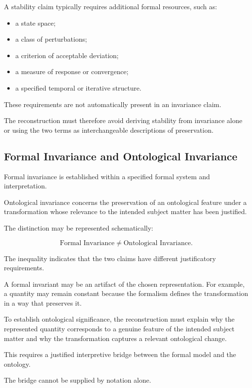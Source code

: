 A stability claim typically requires additional
formal resources, such as:

\begin{itemize}
    \item a state space;
    \item a class of perturbations;
    \item a criterion of acceptable deviation;
    \item a measure of response or convergence;
    \item a specified temporal or iterative structure.
\end{itemize}

These requirements are not automatically present
in an invariance claim.

The reconstruction must therefore avoid deriving
stability from invariance alone or using the two
terms as interchangeable descriptions of
preservation.

\subsection{Formal Invariance and Ontological Invariance}

Formal invariance is established within a
specified formal system and interpretation.

Ontological invariance concerns the preservation
of an ontological feature under a transformation
whose relevance to the intended subject matter
has been justified.

The distinction may be represented schematically:

\[
    \text{Formal Invariance}
    \neq
    \text{Ontological Invariance}.
\]

The inequality indicates that the two claims
have different justificatory requirements.

A formal invariant may be an artifact of the
chosen representation. For example, a quantity
may remain constant because the formalism
defines the transformation in a way that
preserves it.

To establish ontological significance, the
reconstruction must explain why the represented
quantity corresponds to a genuine feature of
the intended subject matter and why the
transformation captures a relevant ontological
change.

This requires a justified interpretive bridge
between the formal model and the ontology.

The bridge cannot be supplied by notation
alone.

